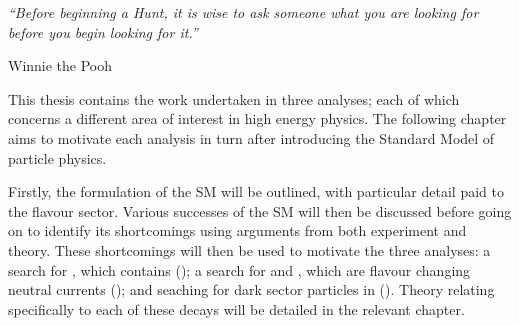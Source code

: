 
\begin{minipage}{\textwidth}
  {\it ``Before beginning a Hunt, it is wise to ask someone what you are looking for before you
  begin looking for it.''}

  {\hfill Winnie the Pooh}
\end{minipage}

\vspace{2em}

This thesis contains the work undertaken in three analyses; each of which concerns a different area
of interest in high energy physics.
The following chapter aims to motivate each analysis in turn after introducing the Standard Model
of particle physics.

Firstly, the formulation of the SM will be outlined, with particular detail paid to the flavour
sector.
Various successes of the SM will then be discussed before going on to identify its shortcomings
using arguments from both experiment and theory.
These shortcomings will then be used to motivate the three analyses:
a search for \btodsphi, which contains  ();
a search for \btokpipimumu and \btophikmumu, which are flavour changing neutral currents
();
and seaching for dark sector particles in \btokstmumu ().
Theory relating specifically to each of these decays will be detailed in the relevant chapter.


